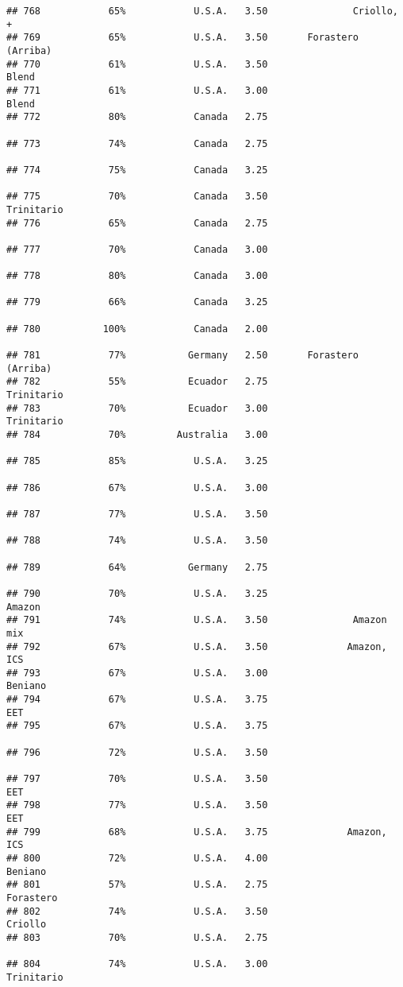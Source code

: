 \documentclass[
]{article}
\begin{document}
\begin{verbatim}
## 768            65%            U.S.A.   3.50               Criollo, +
## 769            65%            U.S.A.   3.50       Forastero (Arriba)
## 770            61%            U.S.A.   3.50                    Blend
## 771            61%            U.S.A.   3.00                    Blend
## 772            80%            Canada   2.75                         
## 773            74%            Canada   2.75                         
## 774            75%            Canada   3.25                         
## 775            70%            Canada   3.50               Trinitario
## 776            65%            Canada   2.75                         
## 777            70%            Canada   3.00                         
## 778            80%            Canada   3.00                         
## 779            66%            Canada   3.25                         
## 780           100%            Canada   2.00                         
## 781            77%           Germany   2.50       Forastero (Arriba)
## 782            55%           Ecuador   2.75               Trinitario
## 783            70%           Ecuador   3.00               Trinitario
## 784            70%         Australia   3.00                         
## 785            85%            U.S.A.   3.25                         
## 786            67%            U.S.A.   3.00                         
## 787            77%            U.S.A.   3.50                         
## 788            74%            U.S.A.   3.50                         
## 789            64%           Germany   2.75                         
## 790            70%            U.S.A.   3.25                   Amazon
## 791            74%            U.S.A.   3.50               Amazon mix
## 792            67%            U.S.A.   3.50              Amazon, ICS
## 793            67%            U.S.A.   3.00                  Beniano
## 794            67%            U.S.A.   3.75                      EET
## 795            67%            U.S.A.   3.75                         
## 796            72%            U.S.A.   3.50                         
## 797            70%            U.S.A.   3.50                      EET
## 798            77%            U.S.A.   3.50                      EET
## 799            68%            U.S.A.   3.75              Amazon, ICS
## 800            72%            U.S.A.   4.00                  Beniano
## 801            57%            U.S.A.   2.75                Forastero
## 802            74%            U.S.A.   3.50                  Criollo
## 803            70%            U.S.A.   2.75                         
## 804            74%            U.S.A.   3.00               Trinitario

\end{verbatim}
\end{document}
